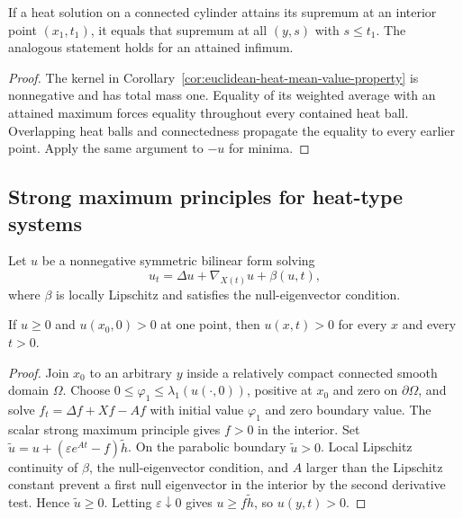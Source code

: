 \begin{corollary}
\label{cor:heat-mean-value-strong-maximum-principle}


If a heat solution on a connected cylinder attains its supremum at an
interior point $(x_1,t_1)$, it equals that supremum at all $(y,s)$ with
$s\leq t_1$.  The analogous statement holds for an attained infimum.
\end{corollary}

\begin{proof}
\sketch
The kernel in Corollary~\ref{cor:euclidean-heat-mean-value-property} is
nonnegative and has total mass one.  Equality of its weighted average with an
attained maximum forces equality throughout every contained heat ball.
Overlapping heat balls and connectedness propagate the equality to every
earlier point.  Apply the same argument to $-u$ for minima.
\end{proof}

\subsection{Strong maximum principles for heat-type systems}

Let $u$ be a nonnegative symmetric bilinear form solving
\[
u_t=\Delta u+\nabla_{X(t)}u+\beta(u,t),
\]
where $\beta$ is locally Lipschitz and satisfies the null-eigenvector
condition.

\begin{proposition}
\label{prop:system-strong-maximum-principle-positive-definite}

If $u\geq0$ and $u(x_0,0)>0$ at one point, then
$u(x,t)>0$ for every $x$ and every $t>0$.
\end{proposition}

\begin{proof}
\sketch
{}
Join $x_0$ to an arbitrary $y$ inside a relatively compact connected smooth
domain $\Omega$.  Choose $0\leq\varphi_1\leq\lambda_1(u(\cdot,0))$, positive
at $x_0$ and zero on $\partial\Omega$, and solve
$f_t=\Delta f+Xf-Af$ with initial value $\varphi_1$ and zero boundary value.
The scalar strong maximum principle gives $f>0$ in the interior.  Set
$\widetilde u=u+(\varepsilon e^{At}-f)\widetilde h$.  On the parabolic
boundary $\widetilde u>0$.  Local Lipschitz continuity of $\beta$, the
null-eigenvector condition, and $A$ larger than the Lipschitz constant prevent
a first null eigenvector in the interior by the second derivative test.
Hence $\widetilde u\geq0$.  Letting $\varepsilon\downarrow0$ gives
$u\geq f\widetilde h$, so $u(y,t)>0$.
\end{proof}

